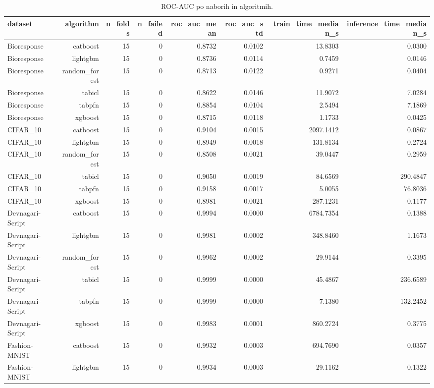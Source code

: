 \begin{table}[htbp]
\centering
\caption{ROC-AUC po naborih in algoritmih.}
\label{tab:per-dataset}
\begin{tabular}{lrrrrrrr}
\hline
dataset & algorithm & n\_folds & n\_failed & roc\_auc\_mean & roc\_auc\_std & train\_time\_median\_s & inference\_time\_median\_s \\
\hline
Bioresponse & catboost & 15 & 0 & 0.8732 & 0.0102 & 13.8303 & 0.0300 \\
Bioresponse & lightgbm & 15 & 0 & 0.8736 & 0.0114 & 0.7459 & 0.0146 \\
Bioresponse & random\_forest & 15 & 0 & 0.8713 & 0.0122 & 0.9271 & 0.0404 \\
Bioresponse & tabicl & 15 & 0 & 0.8622 & 0.0146 & 11.9072 & 7.0284 \\
Bioresponse & tabpfn & 15 & 0 & 0.8854 & 0.0104 & 2.5494 & 7.1869 \\
Bioresponse & xgboost & 15 & 0 & 0.8715 & 0.0118 & 1.1733 & 0.0425 \\
CIFAR\_10 & catboost & 15 & 0 & 0.9104 & 0.0015 & 2097.1412 & 0.0867 \\
CIFAR\_10 & lightgbm & 15 & 0 & 0.8949 & 0.0018 & 131.8134 & 0.2724 \\
CIFAR\_10 & random\_forest & 15 & 0 & 0.8508 & 0.0021 & 39.0447 & 0.2959 \\
CIFAR\_10 & tabicl & 15 & 0 & 0.9050 & 0.0019 & 84.6569 & 290.4847 \\
CIFAR\_10 & tabpfn & 15 & 0 & 0.9158 & 0.0017 & 5.0055 & 76.8036 \\
CIFAR\_10 & xgboost & 15 & 0 & 0.8981 & 0.0021 & 287.1231 & 0.1177 \\
Devnagari-Script & catboost & 15 & 0 & 0.9994 & 0.0000 & 6784.7354 & 0.1388 \\
Devnagari-Script & lightgbm & 15 & 0 & 0.9981 & 0.0002 & 348.8460 & 1.1673 \\
Devnagari-Script & random\_forest & 15 & 0 & 0.9962 & 0.0002 & 29.9144 & 0.3395 \\
Devnagari-Script & tabicl & 15 & 0 & 0.9999 & 0.0000 & 45.4867 & 236.6589 \\
Devnagari-Script & tabpfn & 15 & 0 & 0.9999 & 0.0000 & 7.1380 & 132.2452 \\
Devnagari-Script & xgboost & 15 & 0 & 0.9983 & 0.0001 & 860.2724 & 0.3775 \\
Fashion-MNIST & catboost & 15 & 0 & 0.9932 & 0.0003 & 694.7690 & 0.0357 \\
Fashion-MNIST & lightgbm & 15 & 0 & 0.9934 & 0.0003 & 29.1162 & 0.1322 \\

\end{tabular}
\end{table}
